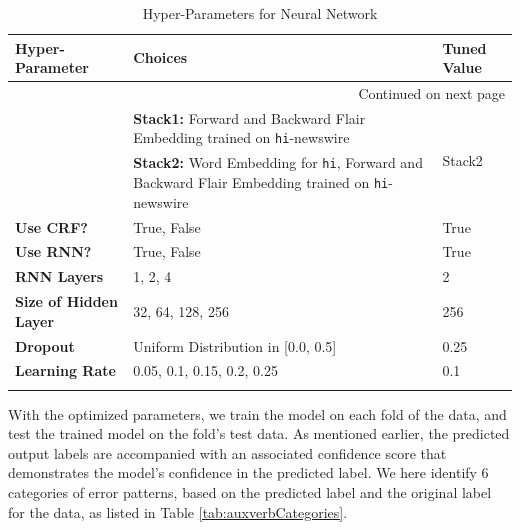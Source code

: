 \begin{longtable}{|l|p{6cm}|l|}
    \hline 
    \multicolumn{1}{|l|}{\textbf{Hyper-Parameter}} &
    \multicolumn{1}{p{6cm}|}{\textbf{Choices}} &
    \multicolumn{1}{l|}{\textbf{Tuned Value}} \\
    \hline 
    \endhead
    \hline 
    \multicolumn{3}{|r|}{{Continued on next page}} \\ 
    \hline
    \endfoot
    \endlastfoot
    \hline
    \label{tab:auxverbHyper}
        \multirow{2}{*}{\textbf{Embeddings}} & \textbf{Stack1:} Forward and Backward Flair Embedding trained on \verb|hi|-newswire & \multirow{2}{*}{Stack2}\\
        & \textbf{Stack2:} Word Embedding for \verb|hi|, Forward and Backward Flair Embedding trained on \verb|hi|-newswire & \\
        \hline
        \textbf{Use CRF?} & True, False & True\\
        \hline
        \textbf{Use RNN?} & True, False & True\\
        \hline
        \textbf{RNN Layers} & 1, 2, 4 & 2\\
        \hline
        \textbf{Size of Hidden Layer} & 32, 64, 128, 256 & 256\\
        \hline
        \textbf{Dropout} & Uniform Distribution in [0.0, 0.5] & 0.25\\
        \hline
        \textbf{Learning Rate} & 0.05, 0.1, 0.15, 0.2, 0.25 & 0.1\\
        \hline
    \caption{Hyper-Parameters for Neural Network}
\end{longtable}

With the optimized parameters, we train the model on each fold of the data, and test the trained model on the fold's test data. As mentioned earlier, the predicted output labels are accompanied with an associated confidence score that demonstrates the model's confidence in the predicted label. We here identify 6 categories of error patterns, based on the predicted label and the original label for the data, as listed in Table \ref{tab:auxverbCategories}.

